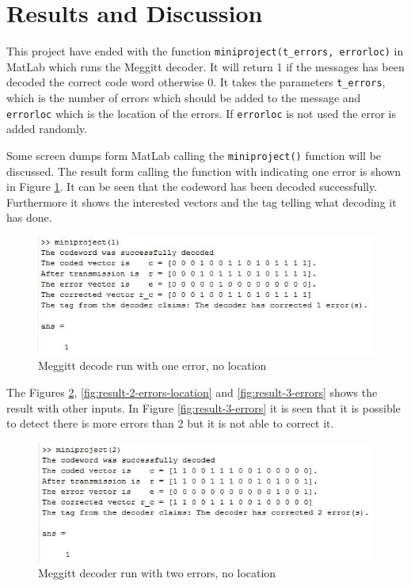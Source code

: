 \documentclass[Main]{subfiles}
\begin{document}
\section{Results and Discussion}
This project have ended with the function \texttt{miniproject(t\_errors, errorloc)} in MatLab which runs the Meggitt decoder.
It will return 1 if the messages has been decoded the correct code word otherwise 0.
It takes the parameters \texttt{t\_errors}, which is the number of errors which should be added to the message and \texttt{errorloc} which is the location of the errors.
If \texttt{errorloc} is not used the error is added randomly.

Some screen dumps form MatLab calling the \texttt{miniproject()} function will be discussed.
The result form calling the function with indicating one error is shown in Figure \ref{fig:result-1-errors}.
It can be seen that the codeword has been decoded successfully.
Furthermore it shows the interested vectors and the tag telling what decoding it has done. 

\begin{figure}[h!]
\centering
\includegraphics[width=0.7\linewidth]{./Picture/result-1-errors}
\caption{Meggitt decode run with one error, no location}
\label{fig:result-1-errors}
\end{figure}

The Figures \ref{fig:result-2-errors}, \ref{fig:result-2-errors-location} and \ref{fig:result-3-errors} shows the result with other inputs.
In Figure \ref{fig:result-3-errors} it is seen that it is possible to detect there is more errors than 2 but it is not able to correct it. 

\begin{figure}[h!]
\centering
\includegraphics[width=0.7\linewidth]{./Picture/result-2-errors}
\caption{Meggitt decoder run with two errors, no location}
\label{fig:result-2-errors}
\end{figure}
\end{document}
